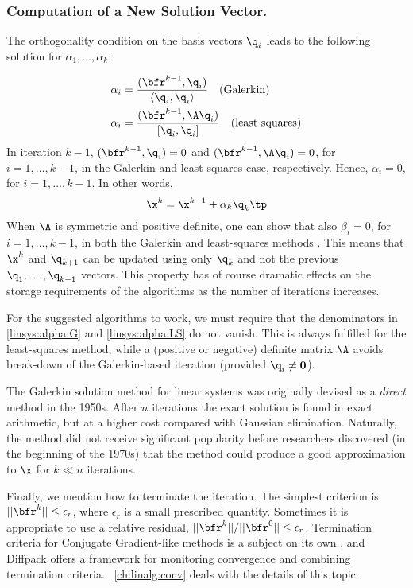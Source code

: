 \subsubsection{Computation of a New Solution Vector.}
The orthogonality condition on the basis vectors $\q_i$ leads to
the following solution for $\alpha_1,\ldots,\alpha_k$:

\begin{align}
\alpha_i &= { (\bfr^{k-1},\q_i)\over \langle \q_i,\q_i\rangle}
\quad\hbox{(Galerkin)}\label{linsys:alpha:G}\\
\alpha_i &= { (\bfr^{k-1},\A\q_i)\over [ \q_i,\q_i]}
\quad\hbox{(least squares)}\label{linsys:alpha:LS}
\end{align}
In iteration $k-1$, $(\bfr^{k-1},\q_i)=0$ and $(\bfr^{k-1},\A\q_i)=0$, for
$i=1,\ldots,k-1$, in the Galerkin and least-squares case, respectively.
Hence, $\alpha_i =0$, for $i=1,\ldots, k-1$. In other words,
\[ \x^{k} = \x^{k-1} + \alpha_k\q_k \tp\]
When $\A$ is symmetric and positive definite, one can show that
also $\beta_i=0$, for $i=1,\ldots,k-1$, in both the Galerkin and least-squares
methods \cite{BruBok}.
This means that $\x^k$ and $\q_{k+1}$ can be updated using only
$\q_k$ and not the previous $\q_1,\ldots,\q_{k-1}$ vectors.
This property has of course dramatic effects on the storage requirements
of the algorithms as the number of iterations increases.

For the suggested algorithms to work,
we must require that the denominators in
\eqref{linsys:alpha:G} and \eqref{linsys:alpha:LS} do not vanish.
This is always fulfilled for the least-squares method, while a
(positive or negative) definite matrix $\A$ avoids break-down of
the Galerkin-based iteration (provided $\q_i \neq \mathbf{0}$).


The Galerkin solution method for linear systems was originally devised
as a \emph{direct} method in the 1950s.
After $n$ iterations the exact solution is
found in exact arithmetic, but at a higher cost compared with
Gaussian elimination. Naturally, the method did not receive significant
popularity before researchers discovered (in the beginning of the 1970s) that
the method could produce a good approximation to $\x$ for $k\ll n$ iterations.

Finally, we mention how to terminate the iteration.
The simplest criterion is $||\bfr^k||\leq\epsilon_r$, where
$\epsilon_r$ is a small prescribed quantity.
Sometimes it is appropriate to use a relative residual,
$||\bfr^k||/||\bfr^0||\leq\epsilon_r$.
Termination criteria for Conjugate Gradient-like methods is a subject
on its own \cite{BruBok}, and Diffpack offers a framework for
monitoring convergence and combining termination criteria.
{\LaChap}~\ref{ch:linalg:conv} deals with the details of this topic.



